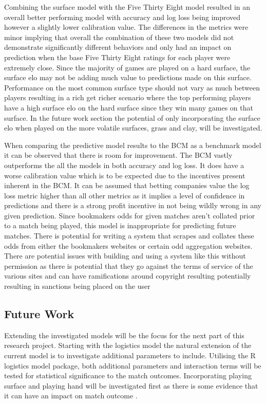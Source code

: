 \documentclass[12pt,a4paper]{article}
\begin{document}
Combining the surface model with the Five Thirty Eight model resulted in an overall better performing
model with accuracy and log loss being improved however a slightly lower calibration value.
The differences in the metrics were minor implying that overall the combination of these two models
did not demonstrate significantly different behaviors and only had an impact on prediction when the
base Five Thirty Eight ratings for each player were extremely close. Since the majority of games
are played on a hard surface, the surface elo may not be adding much value to predictions made on
this surface. Performance on the most common surface type should not vary as much between players
resulting in a rich get richer scenario where the top performing players have a high surface elo
on the hard surface since they win many games on that surface. In the future work section the
potential of only incorporating the surface elo when played on the more volatile surfaces, grass
and clay, will be investigated.

When comparing the predictive model results to the BCM as a benchmark model
it can be observed that there is room for improvement. The BCM vastly
outperforms the all the models in both accuracy and log loss. It does have a worse calibration
value which is to be expected due to the incentives present inherent in the BCM. It can be assumed
that betting companies value the log loss metric higher than all other metrics as it implies a level
of confidence in predictions and there is a strong profit incentive in not being wildly wrong
in any given prediction. Since bookmakers odds for given matches aren't collated prior to a match
being played, this model is inappropriate for predicting future matches. There is potential for
writing a system that scrapes and collates these odds from either the bookmakers websites or
certain odd aggregation websites. There are potential issues with building and using a system like
this without permission as there is potential that they go against the terms of service of the
various sites and can have ramifications around copyright resulting potentially resulting in
sanctions being placed on the user \cite{out-lawcom_ryanair_nodate}

\subsection{Future Work}
Extending the investigated models will be the focus for the next part of this research
project. Starting with the logistics model the natural extension of the current model
is to investigate additional parameters to include. Utilising the R logistics model
package, both additional parameters and interaction terms will be tested for statistical
significance to the match outcomes. Incorporating playing surface and playing hand will
be investigated first as there is some evidence that it can have an impact on match
outcome \cite{loffing_left-handedness_2012}.
\end{document}
